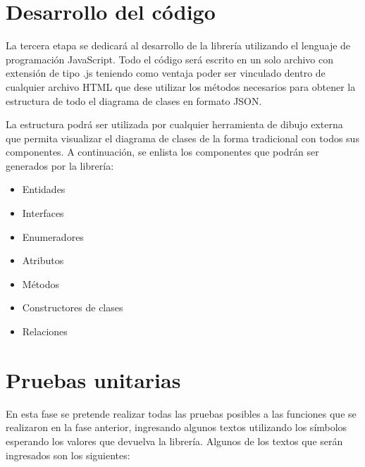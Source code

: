 \documentclass[12pt, openany, xcolor=table]{book}
\begin{document}
	\section{Desarrollo del código}
	
	La tercera etapa se dedicará al desarrollo de la librería utilizando el lenguaje de programación JavaScript. Todo el código será escrito en un solo archivo con extensión de tipo .js teniendo como ventaja poder ser vinculado dentro de cualquier archivo HTML que dese utilizar los métodos necesarios para obtener la estructura de todo el diagrama de clases en formato JSON.
	
	La estructura podrá ser utilizada por cualquier herramienta de dibujo externa que permita visualizar el diagrama de clases de la forma tradicional con todos sus componentes. A continuación, se enlista los componentes que podrán ser generados por la librería:
	
	\begin{itemize}
		\item Entidades
		\item Interfaces
		\item Enumeradores
		\item Atributos
		\item Métodos
		\item Constructores de clases
		\item Relaciones
	\end{itemize}

	\section{Pruebas unitarias}
	En esta fase se pretende realizar todas las pruebas posibles a las funciones que se realizaron en la fase anterior, ingresando algunos textos utilizando los símbolos esperando los valores que devuelva la librería. Algunos de los textos que serán ingresados son los siguientes:
	
\end{document}
